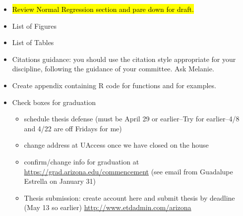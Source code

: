 \documentclass[12pt, a4paper]{article}
\begin{document}
\begin{itemize}
  \item \hl{Review Normal Regression section and pare down for draft.}
  \item List of Figures
  \item List of Tables
  \item Citations guidance:  you should use the citation style appropriate for your discipline, following
the guidance of your committee.  Ask Melanie.
  \item Create appendix containing R code for functions and for examples.
  \item Check boxes for graduation
  \begin{itemize}
    \item schedule thesis defense (must be April 29 or earlier--Try for earlier--4/8 and 4/22 are off Fridays for me)
    \item change address at UAccess once we have closed on the house
    \item confirm/change info for graduation at \url{https://grad.arizona.edu/commencement} (see email from Guadalupe Estrella on January 31)
    \item Thesis submission:  create account here and submit thesis by deadline (May 13 so earlier) \url{http://www.etdadmin.com/arizona}
  \end{itemize}
\end{itemize}
\end{document}
